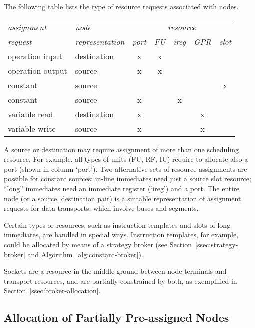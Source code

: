 \documentclass[a4paper,twoside]{tce}
\begin{document}
The following table lists the type of resource requests associated with
nodes.
\begin{flushleft}
\begin{tabular}{|l|l|c|c|c|c|c|}
    \hline
    \emph{assignment} & \emph{node}  &
      \multicolumn{5}{c|}{\emph{resource}} \\
    \emph{request} & \emph{representation} &
      \emph{port} & \emph{FU} & \emph{ireg} & \emph{GPR} & \emph{slot} \\
    \hline

    operation input  & destination & x & x &   &   &   \\
    \hline
    operation output & source      & x & x &   &   &   \\
    \hline
    constant         & source      &   &   &   &   & x \\
    \hline
    constant         & source      & x &   & x &   &   \\
    \hline
    variable read    & destination & x &   &   & x &   \\
    \hline
    variable write   & source      & x &   &   & x &   \\
    \hline
  \end{tabular}
\end{flushleft}

A source or destination may require assignment of more than one scheduling
resource. For example, all types of units (FU, RF, IU) require to allocate
also a port (shown in column `port').
%
Two alternative sets of resource assignments are possible for constant
sources: in-line immediates need just a source slot resource; ``long''
immediates need an immediate register (`ireg') and a port.
%
The entire node (or a source, destination pair) is a suitable representation
of assignment requests for data transports, which involve buses and
segments.

Certain types or resources, such as instruction templates and
slots of long immediates, are handled in special ways. Instruction
templates, for example, could be allocated by means of a strategy broker
(see Section~\ref{ssec:strategy-broker} and 
Algorithm~\ref{alg:constant-broker}).
%

Sockets are a resource in the middle ground between node terminals and
transport resources, and are partially constrained by both, as exemplified
in Section~\ref{ssec:broker-allocation}.

\subsection{Allocation of Partially Pre-assigned Nodes}
\end{document}
